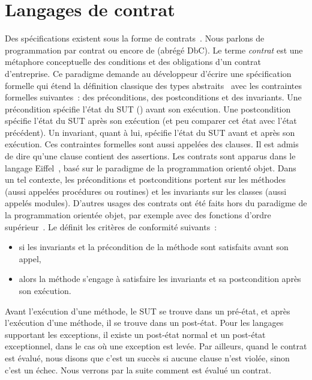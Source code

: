 \section{Langages de contrat}
\label{section:sota:bisl}

Des spécifications existent sous la forme de {\strong contrats}~. Nous parlons de programmation par contrat ou encore de
 (abrégé DbC). Le terme {\em contrat} est une
métaphore conceptuelle des conditions et des obligations d'un contrat
d'entreprise. Ce paradigme demande au développeur d'écrire une spécification
formelle qui étend la définition classique des types abstraits~
avec les contraintes formelles suivantes~: des {\strong préconditions}, des
{\strong postconditions} et des {\strong invariants}. Une précondition spécifie
l'état du SUT () avant son exécution. Une
postcondition spécifie l'état du SUT après son exécution (et peu comparer cet
état avec l'état précédent). Un invariant, quant à lui, spécifie l'état du SUT
avant et après son exécution.  Ces contraintes formelles sont aussi appelées des
{\strong clauses}. Il est admis de dire qu'une clause contient des {\strong
assertions}. Les contrats sont apparus dans le langage Eiffel~,
basé sur le paradigme de la programmation orienté objet. Dans un tel contexte,
les préconditions et postconditions portent sur les méthodes (aussi appelées
procédures ou routines) et les invariants sur les classes (aussi appelés
modules). D'autres usages des contrats ont été faits hors du paradigme de la
programmation orientée objet, par exemple avec des fonctions d'ordre
supérieur~. Le  définit les
critères de conformité suivants~:
%
\begin{itemize}

\item si les invariants et la précondition de la méthode sont satisfaits avant
son appel,

\item alors la méthode s'engage à satisfaire les invariants et sa postcondition
après son exécution.

\end{itemize}
%
Avant l'exécution d'une méthode, le SUT se trouve dans un {\strong pré-état}, et
après l'exécution d'une méthode, il se trouve dans un {\strong post-état}. Pour
les langages supportant les exceptions, il existe un post-état normal et un
post-état exceptionnel, dans le cas où une exception est levée. Par ailleurs,
quand le contrat est évalué, nous disons que c'est un {\strong succès} si aucune
clause n'est violée, sinon c'est un {\strong échec}. Nous verrons par la suite
comment est évalué un contrat.

